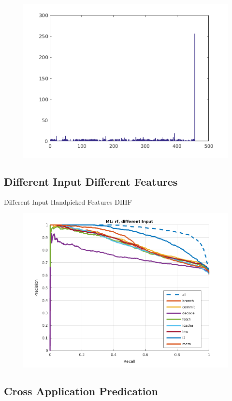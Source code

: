 \begin{figure}[t]
\begin{center}
   \includegraphics[width=0.95\linewidth]{./figures/feat_diff.png}
\end{center}
   \caption{}
\label{fig:feat-diff}
\end{figure}

\subsection{Different Input Different Features}
Different Input Handpicked Features DIHF

\begin{figure}[t]
\begin{center}
   \includegraphics[width=0.95\linewidth]{./figures/didf.png}
\end{center}
   \caption{}
\label{fig:didf}
\end{figure}

\subsection{Cross Application Predication}
